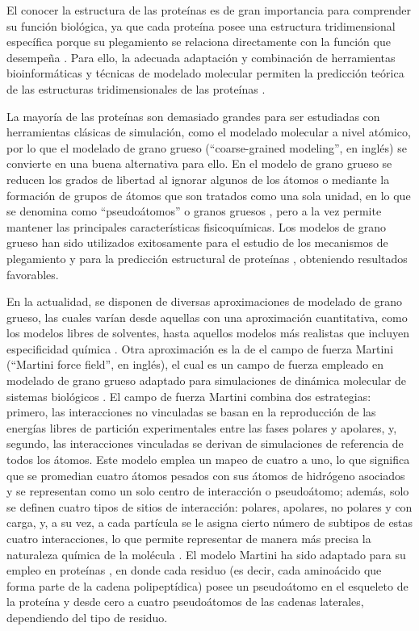 \documentclass[3pt,twocolumn]{elsarticle}
\begin{document}
El conocer la estructura de las proteínas es de gran importancia para comprender su función biológica, ya que cada proteína posee una estructura tridimensional específica porque su plegamiento se relaciona directamente con la función que desempeña \cite{de2012}. Para ello, la adecuada adaptación y combinación de herramientas bioinformáticas y técnicas de modelado molecular permiten la predicción teórica de las estructuras tridimensionales de las proteínas \cite{haas2013}. 

La mayoría de las proteínas son demasiado grandes para ser estudiadas con herramientas clásicas de simulación, como el modelado molecular a nivel atómico, por lo que el modelado de grano grueso (``coarse-grained modeling'', en inglés) se convierte en una buena alternativa para ello. En el modelo de grano grueso se reducen los grados de libertad al ignorar algunos de los átomos o mediante la formación de grupos de átomos que son tratados como una sola unidad, en lo que se denomina como ``pseudoátomos'' o granos gruesos \cite{blaszczy}, pero a la vez permite mantener las principales características fisicoquímicas. Los modelos de grano grueso han sido utilizados exitosamente para el estudio de los mecanismos de plegamiento y para la predicción estructural de proteínas \cite{kmiecik}, obteniendo resultados favorables.

En la actualidad, se disponen de diversas aproximaciones de modelado de grano grueso, las cuales varían desde aquellas con una aproximación cuantitativa, como los modelos libres de solventes, hasta aquellos modelos más realistas que incluyen especificidad química \cite{voth2008}. Otra aproximación es la de el campo de fuerza Martini (``Martini force field'', en inglés), el cual es un campo de fuerza empleado en modelado de grano grueso adaptado para simulaciones de dinámica molecular de sistemas biológicos \cite{marrink2007}. El campo de fuerza Martini combina dos estrategias: primero, las interacciones no vinculadas se basan en la reproducción de las energías libres de partición experimentales entre las fases polares y apolares, y, segundo, las interacciones vinculadas se derivan de simulaciones de referencia de todos los átomos. Este modelo emplea un mapeo de cuatro a uno, lo que significa que se promedian cuatro átomos pesados con sus átomos de hidrógeno asociados y se representan como un solo centro de interacción o pseudoátomo; además, solo se definen cuatro tipos de sitios de interacción: polares, apolares, no polares y con carga, y, a su vez, a cada partícula se le asigna cierto número de subtipos de estas cuatro interacciones, lo que permite representar de manera más precisa la naturaleza química de la molécula \cite{marrink2007}. El modelo Martini ha sido adaptado para su empleo en proteínas \cite{monticelli2008}, en donde cada residuo (es decir, cada aminoácido que forma parte de la cadena polipeptídica) posee un pseudoátomo en el esqueleto de la proteína y desde cero a cuatro pseudoátomos de las cadenas laterales, dependiendo del tipo de residuo. 
\end{document}
